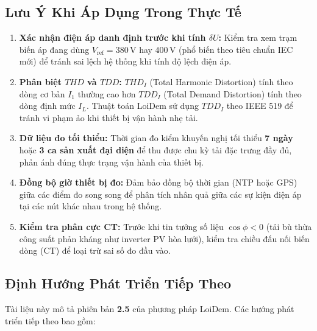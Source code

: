\documentclass[12pt,a4paper]{article}
\begin{document}
\subsection{Lưu Ý Khi Áp Dụng Trong Thực Tế}

\begin{warningbox}[title=Các Điểm Cần Lưu Ý Khi Triển Khai Đánh Giá Thực Địa]
\begin{enumerate}
  \item \textbf{Xác nhận điện áp danh định trước khi tính $\delta U$:} Kiểm tra xem trạm biến áp đang dùng $V_{\mathrm{ref}} = 380\,\mathrm{V}$ hay $400\,\mathrm{V}$ (phổ biến theo tiêu chuẩn IEC mới) để tránh sai lệch hệ thống khi tính độ lệch điện áp.
  \item \textbf{Phân biệt $THD$ và $TDD$:} $THD_I$ (Total Harmonic Distortion) tính theo dòng cơ bản $I_1$ thường cao hơn $TDD_I$ (Total Demand Distortion) tính theo dòng định mức $I_L$. Thuật toán LoiDem sử dụng $TDD_I$ theo IEEE 519 để tránh vi phạm ảo khi thiết bị vận hành nhẹ tải.
  \item \textbf{Dữ liệu đo tối thiểu:} Thời gian đo kiểm khuyến nghị tối thiểu \textbf{7 ngày} hoặc \textbf{3 ca sản xuất đại diện} để thu được chu kỳ tải đặc trưng đầy đủ, phản ánh đúng thực trạng vận hành của thiết bị.
  \item \textbf{Đồng bộ giờ thiết bị đo:} Đảm bảo đồng bộ thời gian (NTP hoặc GPS) giữa các điểm đo song song để phân tích nhân quả giữa các sự kiện điện áp tại các nút khác nhau trong hệ thống.
  \item \textbf{Kiểm tra phân cực CT:} Trước khi tin tưởng số liệu $\cos\phi < 0$ (tải bù thừa công suất phản kháng như inverter PV hòa lưới), kiểm tra chiều đấu nối biến dòng (CT) để loại trừ sai số đo đầu vào.
\end{enumerate}
\end{warningbox}

\subsection{Định Hướng Phát Triển Tiếp Theo}

Tài liệu này mô tả phiên bản \textbf{2.5} của phương pháp LoiDem. Các hướng phát triển tiếp theo bao gồm:
\end{document}

